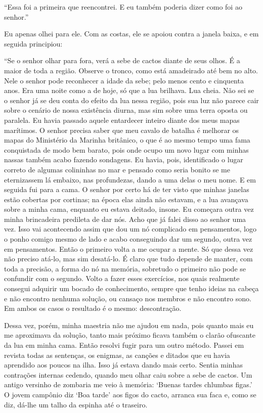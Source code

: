 ``Essa foi a primeira que reencontrei. E eu também poderia dizer como
foi ao senhor.''

Eu apenas olhei para ele. Com as costas, ele se apoiou contra a janela
baixa, e em seguida principiou:

``Se o senhor olhar para fora, verá a sebe de cactos diante de seus
olhos. É a maior de toda a região. Observe o tronco, como está
amadeirado até bem no alto. Nele o senhor pode reconhecer a idade da
sebe; pelo menos cento e cinquenta anos. Era uma noite como a de hoje,
só que a lua brilhava. Lua cheia. Não sei se o senhor já se deu conta do
efeito da lua nessa região, pois sua luz não parece cair sobre o cenário
de nossa existência diurna, mas sim sobre uma terra oposta ou paralela.
Eu havia passado aquele entardecer inteiro diante dos meus mapas
marítimos. O senhor precisa saber que meu cavalo de batalha é melhorar
os mapas do Ministério da Marinha britânico, o que é ao mesmo tempo uma
fama conquistada de modo bem barato, pois onde ocupo um novo lugar com
minhas nassas também acabo fazendo sondagens. Eu havia, pois,
identificado o lugar correto de algumas colininhas no mar e pensado como
seria bonito se me eternizassem lá embaixo, nas profundezas, dando a uma
delas o meu nome. E em seguida fui para a cama. O senhor por certo há de
ter visto que minhas janelas estão cobertas por cortinas; na época elas
ainda não estavam, e a lua avançava sobre a minha cama, enquanto eu
estava deitado, insone. Eu começara outra vez minha brincadeira
predileta de dar nós. Acho que já falei disso ao senhor uma vez. Isso
vai acontecendo assim que dou um nó complicado em pensamentos, logo o
ponho comigo mesmo de lado e acabo conseguindo dar um segundo, outra vez
em pensamentos. Então o primeiro volta a me ocupar a mente. Só que dessa
vez não preciso atá-lo, mas sim desatá-lo. É claro que tudo depende de
manter, com toda a precisão, a forma do nó na memória, sobretudo o
primeiro não pode se confundir com o segundo. Volto a fazer esses
exercícios, nos quais realmente consegui adquirir um bocado de
conhecimento, sempre que tenho ideias na cabeça e não encontro nenhuma
solução, ou cansaço nos membros e não encontro sono. Em ambos os casos o
resultado é o mesmo: descontração.

Dessa vez, porém, minha maestria não me ajudou em nada, pois quanto mais
eu me aproximava da solução, tanto mais próximo ficava também o clarão
ofuscante da lua em minha cama. Então resolvi fugir para um outro
método. Passei em revista todas as sentenças, os enigmas, as canções e
ditados que eu havia aprendido aos poucos na ilha. Isso já estava dando
mais certo. Sentia minhas contrações internas cedendo, quando meu olhar
caiu sobre a sebe de cactos. Um antigo versinho de zombaria me veio à
memória: `Buenas tardes chlumbas figas.' O jovem campônio diz `Boa
tarde' aos figos do cacto, arranca sua faca e, como se diz, dá-lhe um
talho da espinha até o traseiro.

